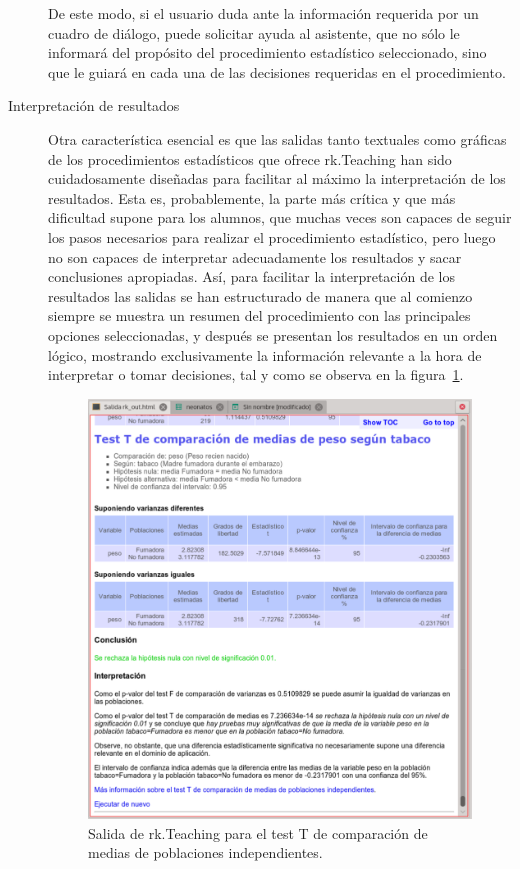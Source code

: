 \documentclass[a4paper,10pt,twoside]{article}
\newcommand{\rkteaching}{\textsf{rk.Teaching}}
\begin{document}
\begin{description}
De este modo, si el usuario duda ante la información requerida por un cuadro de diálogo, puede solicitar
ayuda al asistente, que no sólo le informará del propósito del procedimiento estadístico seleccionado, sino que le
guiará en cada una de las decisiones requeridas en el procedimiento.

\item[Interpretación de resultados] Otra característica esencial es que las salidas tanto textuales como gráficas
de los procedimientos estadísticos que ofrece \rkteaching{} han sido cuidadosamente diseñadas para facilitar al máximo
la interpretación de los resultados. 
Esta es, probablemente, la parte más crítica y que más dificultad supone para los alumnos, que muchas veces son
capaces de seguir los pasos necesarios para realizar el procedimiento estadístico, pero luego no son capaces de
interpretar adecuadamente los resultados y sacar conclusiones apropiadas. 
Así, para facilitar la interpretación de los resultados las salidas se han estructurado de manera que al
comienzo siempre se muestra un resumen del procedimiento con las principales opciones seleccionadas, y
después se presentan los resultados en un orden lógico, mostrando exclusivamente la información relevante
a la hora de interpretar o tomar decisiones, tal y como se observa en la figura~\ref{f:salida-test-t}. 

\begin{figure}[htbp!]
\centering
\includegraphics[width=\textwidth]{img/salida_test_t.png}
\caption{Salida de \rkteaching{} para el test T de comparación de medias de poblaciones independientes.}
\label{f:salida-test-t}
\end{figure}


\end{description}
\end{document}
